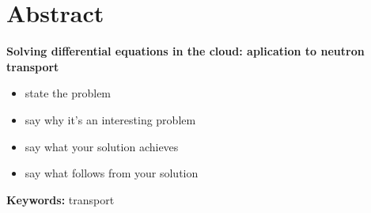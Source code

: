 %
%

\chapter*{Abstract}

\vspace{1cm plus 0.5cm}

\begin{center}
\makeatletter
\parbox{0.65\linewidth}{\centering\large{\textbf{Solving differential equations in the cloud: aplication to neutron transport}}}
\makeatother
\end{center}

\vspace{0.75cm plus 0.5cm}



\begin{itemize}
\tightlist
\item
  state the problem
\item
  say why it's an interesting problem
\item
  say what your solution achieves
\item
  say what follows from your solution
\end{itemize}

\noindent
\lipsum[14]

\vspace{\fill}

\begin{small}
\noindent\textsf{\textbf{Keywords:}
transport}
\end{small}

\thispagestyle{empty}
